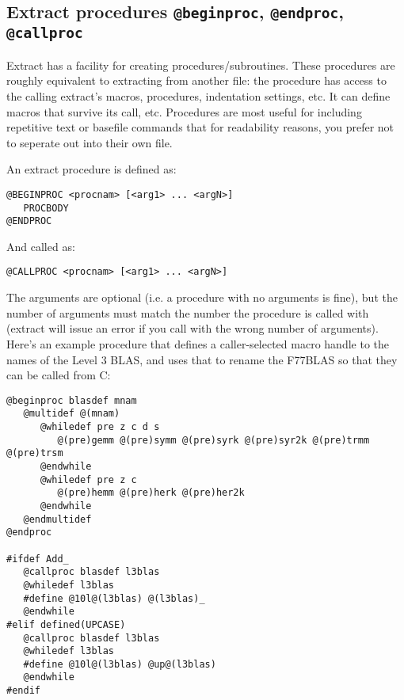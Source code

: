 \subsection{Extract procedures {\tt @beginproc}, {\tt @endproc}, 
            {\tt @callproc}}
Extract has a facility for creating procedures/subroutines.  These
procedures are roughly equivalent to extracting from another file:
the procedure has access to the calling extract's macros, procedures,
indentation settings, etc.  It can define macros that survive its
call, etc.  Procedures are most useful for including repetitive
text or basefile commands that for readability reasons, you prefer
not to seperate out into their own file.

An extract procedure is defined as:
\begin{verbatim}
@BEGINPROC <procnam> [<arg1> ... <argN>]
   PROCBODY
@ENDPROC
\end{verbatim}

And called as:
\begin{verbatim}
@CALLPROC <procnam> [<arg1> ... <argN>]
\end{verbatim}

The arguments are optional (i.e. a procedure with no arguments is fine),
but the number of arguments must match the number the procedure is called
with (extract will issue an error if you call with the wrong number of
arguments).  Here's an example procedure that defines a caller-selected
macro handle to the names of the Level 3 BLAS, and uses that to rename
the F77BLAS so that they can be called from C:

\begin{verbatim}
@beginproc blasdef mnam
   @multidef @(mnam)
      @whiledef pre z c d s
         @(pre)gemm @(pre)symm @(pre)syrk @(pre)syr2k @(pre)trmm @(pre)trsm
      @endwhile
      @whiledef pre z c 
         @(pre)hemm @(pre)herk @(pre)her2k
      @endwhile
   @endmultidef
@endproc

#ifdef Add_
   @callproc blasdef l3blas
   @whiledef l3blas
   #define @10l@(l3blas) @(l3blas)_
   @endwhile
#elif defined(UPCASE)
   @callproc blasdef l3blas
   @whiledef l3blas
   #define @10l@(l3blas) @up@(l3blas)
   @endwhile
#endif
\end{verbatim}

